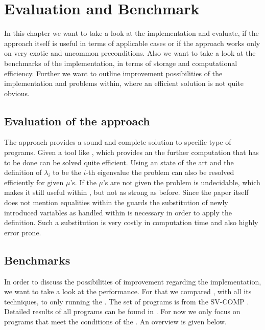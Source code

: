 \chapter{Evaluation and Benchmark}
\label{chapter:eval}
In this chapter we want to take a look at the implementation and evaluate, if the approach itself is useful in terms of applicable cases or if the approach works only on very exotic and uncommon preconditions. \newline
Also we want to take a look at the benchmarks of the implementation, in terms of storage and computational efficiency. \newline
Further we want to outline improvement possibilities of the implementation and problems within, where an efficient solution is not quite obvious.

\section{Evaluation of the approach}
The approach provides a sound and complete solution to specific type of programs. Given a tool like \aprove, which provides an \its the further computation that has to be done can be solved quite efficient. Using an state of the art \solver and the definition of $\lambda_i$ to be the $i$-th eigenvalue the problem can also be resolved efficiently for given $\mu$'s. If the $\mu$'s are not given the problem is undecidable, which makes it still useful within \aprove, but not as strong as before. \newline
Since the paper itself does not mention equalities within the guards the substitution of newly introduced variables as handled within  is necessary in order to apply the definition. Such a substitution is very costly in computation time and also highly error prone.

\section{Benchmarks}
\label{sec:benchmarks}
In order to discuss the possibilities of improvement regarding the implementation, we want to take a look at the performance. For that we compared \aprove, with all its techniques, to \aprove only running the \gnanal. The set of programs is from the SV-COMP \cite{SVComp}.\newline
Detailed results of all programs can be found in \cite{Benchmark}.
For now we only focus on programs that meet the conditions of the \gnanal. An overview is given below.

